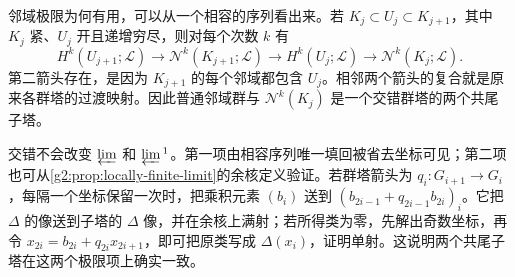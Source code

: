 邻域极限为何有用，可以从一个相容的序列看出来。若 \(K_j\subset U_j\subset K_{j+1}\)，其中 \(K_j\) 紧、\(U_j\) 开且递增穷尽，则对每个次数 \(k\) 有
\[
	H^k(U_{j+1};\mathcal L)\longrightarrow\mathcal N^k(K_{j+1};\mathcal L)
	\longrightarrow H^k(U_j;\mathcal L)\longrightarrow\mathcal N^k(K_j;\mathcal L).
\]
第二箭头存在，是因为 \(K_{j+1}\) 的每个邻域都包含 \(U_j\)。相邻两个箭头的复合就是原来各群塔的过渡映射。因此普通邻域群与 \(\mathcal N^k(K_j)\) 是一个交错群塔的两个共尾子塔。

\ProseParagraphBreak

交错不会改变 \(\varprojlim\) 和 \(\varprojlim{}^1\)。第一项由相容序列唯一填回被省去坐标可见；第二项也可从\cref{g2:prop:locally-finite-limit}的余核定义验证。若群塔箭头为 \(q_i:G_{i+1}\to G_i\)，每隔一个坐标保留一次时，把乘积元素 \((b_i)\) 送到 \((b_{2i-1}+q_{2i-1}b_{2i})_i\)。它把 \(\Delta\) 的像送到子塔的 \(\Delta\) 像，并在余核上满射；若所得类为零，先解出奇数坐标，再令 \(x_{2i}=b_{2i}+q_{2i}x_{2i+1}\)，即可把原类写成 \(\Delta(x_i)\)，证明单射。这说明两个共尾子塔在这两个极限项上确实一致。

